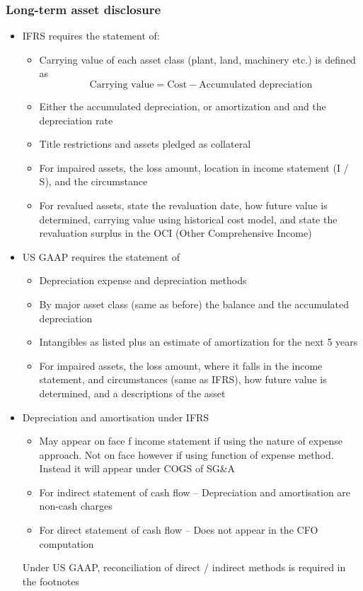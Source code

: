 \documentclass[../notes_compiled.tex]{subfiles}
\begin{document}
\begin{itemize}
\subsubsection{Long-term asset disclosure}
\begin{itemize}
\item IFRS requires the statement of:
\begin{itemize}
\item Carrying value of each asset class (plant, land, machinery etc.) is defined as 
\begin{equation}
\text{Carrying value} = \text{Cost} - \text{Accumulated depreciation}
\end{equation}
\item Either the accumulated depreciation, or amortization and and the depreciation rate
\item Title restrictions and assets pledged as collateral
\item For impaired assets, the loss amount, location in income statement (I / S), and the circumstance
\item For revalued assets, state the revaluation date, how future value is determined, carrying value using historical cost model, and state the revaluation surplus in the OCI (Other Comprehensive Income)
\end{itemize}

\item US GAAP requires the statement of
\begin{itemize}
\item Depreciation expense and depreciation methods
\item By major asset class (same as before) the balance and the accumulated depreciation
\item Intangibles as listed plus an estimate of amortization for the next 5 years
\item For impaired assets, the loss amount, where it falls in the income statement, and circumstances (same as IFRS), how future value is determined, and a descriptions of the asset
\end{itemize}

\item Depreciation and amortisation under IFRS
\begin{itemize}
\item May appear on face f income statement if using the nature of expense approach. Not on face however if using function of expense method. Instead it will appear under COGS of SG\&A
\item For indirect statement of cash flow -- Depreciation and amortisation are non-cash charges
\item For direct statement of cash flow -- Does not appear in the CFO computation
\end{itemize}
Under US GAAP, reconciliation of direct / indirect methods is required in the footnotes
\end{itemize}

\end{itemize}
\end{document}
